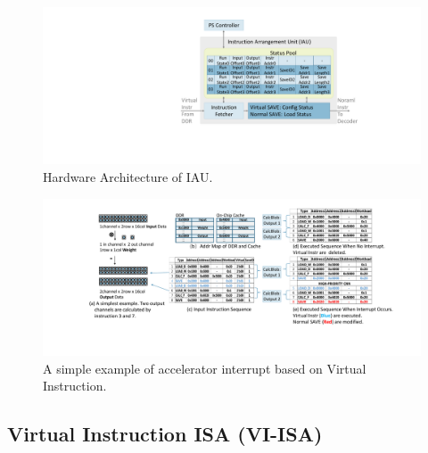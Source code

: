 \begin{figure}[t]
	\centering
    \vspace{-0.1cm} 
    \setlength{\abovecaptionskip}{0cm} 
    \setlength{\belowcaptionskip}{-0.05cm} 
	\includegraphics[width=0.99\linewidth]{fig/iau.pdf}
	\caption{Hardware Architecture of IAU. 
	}
	\label{fig:IAU}
\end{figure}
\begin{figure}[t]
	\centering
    \vspace{-0.1cm} 
    \setlength{\abovecaptionskip}{0cm} 
    \setlength{\belowcaptionskip}{-0.05cm} 
	\includegraphics[width=0.95\linewidth]{fig/interexample.pdf}
	\caption{ A simple example of accelerator interrupt based on Virtual Instruction. }
	\label{fig:interexample}
\end{figure}



\subsection{Virtual Instruction ISA (VI-ISA) }
\label{sec:virtualinstr}

